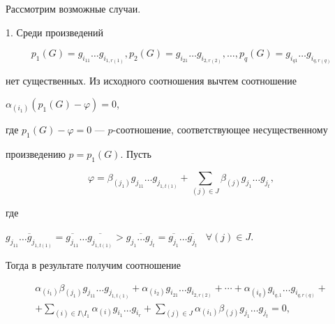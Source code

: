 \begin{pf}
Рассмотрим возможные случаи.





1. Среди произведений


$$


p_{1}(G)=g_{i_{11}}\dotsc g_{i_{1,r(1)}},


p_{2}(G)=g_{i_{21}}\dotsc g_{i_{2,r(2)}}, \dotsc,


p_{q}(G)=g_{i_{q1}}\dotsc g_{i_{q,r(q)}}


$$


нет существенных. Из исходного соотношения вычтем соотношение


$\alpha_{(i_{1})}(p_{1}(G)-\varphi)=0$,


где $p_{1}(G)-\varphi=0$ --- $p$-соотношение, соответствующее несущественному


произведению $p=p_{1}(G)$. Пусть


\begin{equation} \label{varphi}


\varphi=\beta_{(j_{1})}g_{j_{11}}\dotsc g_{j_{1,t(1)}}+


\sum_{(j)\in J}\beta_{(j)}g_{j_{1}}\dotsc g_{j_{t}},


\end{equation}


где


$\overline{g_{j_{11}}\dotsc g_{j_{1,t(1)}}}=


\overline{g_{j_{11}}}\dotsc\overline{g_{j_{1,t(1)}}}>


\overline{g_{j_{1}}\dotsc g_{j_{t}}}=


\overline{g_{j_{1}}}\dotsc\overline{g_{j_{t}}}$ \ $\forall (j)\in J$.


Тогда в результате получим соотношение


\begin{multline*}


\alpha_{(i_{1})}\beta_{(j_{1})}g_{j_{11}}\dotsc g_{j_{1,t(1)}}+


\alpha_{(i_{2})}g_{i_{21}}\dotsc g_{i_{2,r(2)}}+\dotsb+


\alpha_{(i_{q})}g_{i_{q,1}}\dotsc g_{i_{q,r(q)}}+\\


%


+\sum_{(i)\in I\setminus I_{1}}\alpha_{(i)}g_{i_{1}}\dotsc g_{i_{r}}+


\sum_{(j)\in J}\alpha_{(i_{1})}\beta_{(j)}g_{j_{1}}\dotsc g_{j_{t}}=0,


\end{multline*}



\end{pf}
